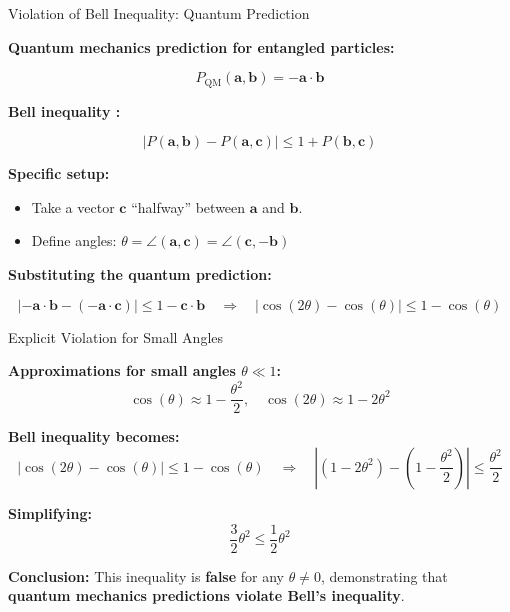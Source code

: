 \begin{frame}{Violation of Bell Inequality: Quantum Prediction}

\textbf{Quantum mechanics prediction for entangled particles:}

\vspace{-0.3cm}

\[
P_\text{QM}(\mathbf{a}, \mathbf{b}) = - \mathbf{a} \cdot \mathbf{b}
\]
\vspace{-0.3cm}

\pause

\textbf{Bell inequality :}

\vspace{-0.3cm}

\[
|P(\mathbf{a},\mathbf{b}) - P(\mathbf{a},\mathbf{c})| \le 1 + P(\mathbf{b},\mathbf{c})
\]

\vspace{-0.3cm}

\pause

\textbf{Specific setup:}
\begin{itemize}
  \item Take a vector $\mathbf{c}$ “halfway” between $\mathbf{a}$ and $\mathbf{b}$.
  \item Define angles:
  \(\theta = \angle(\mathbf{a},\mathbf{c}) = \angle(\mathbf{c},-\mathbf{b})\)
\end{itemize}

\pause

\textbf{Substituting the quantum prediction:}

\vspace{-0.3cm}

\[
|- \mathbf{a} \cdot \mathbf{b} - (- \mathbf{a} \cdot \mathbf{c})|
\le 1 - \mathbf{c} \cdot \mathbf{b}
\quad \Rightarrow \quad
|\cos(2\theta) - \cos(\theta)| \le 1 - \cos(\theta)
\]

\end{frame}



\begin{frame}{Explicit Violation for Small Angles}

\textbf{Approximations for small angles $\theta \ll 1$:}
\[
\cos(\theta) \approx 1 - \frac{\theta^2}{2}, \quad
\cos(2\theta) \approx 1 - 2\theta^2
\]

\pause

\textbf{Bell inequality becomes:}
\[
| \cos(2\theta) - \cos(\theta) | \le 1 - \cos(\theta)
\quad \Rightarrow \quad
|(1 - 2\theta^2) - (1 - \frac{\theta^2}{2})| \le \frac{\theta^2}{2}
\]

\pause

\textbf{Simplifying:}
\[
\frac{3}{2}\theta^2 \le \frac{1}{2} \theta^2
\]

\pause

\textbf{Conclusion:}
This inequality is \textbf{false} for any $\theta \neq 0$, demonstrating that
\textbf{quantum mechanics predictions violate Bell’s inequality}.

\end{frame}


